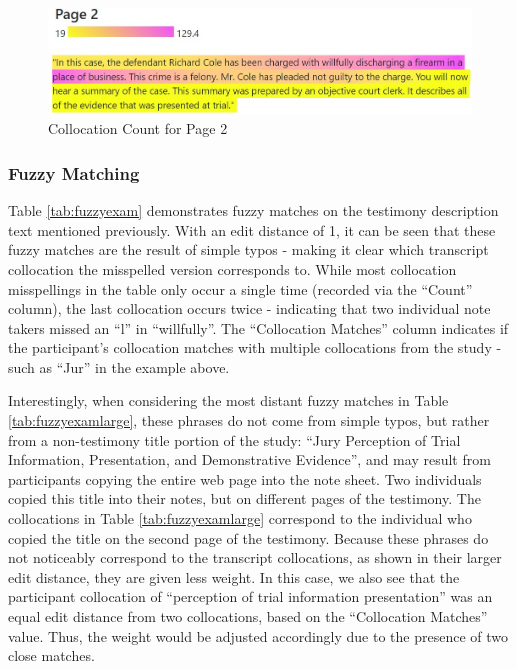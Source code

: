 \documentclass[print]{nuthesis}
\begin{document}
\begin{figure}

{\centering \includegraphics[width=\linewidth]{images/collocationanalysis} 

}

\caption{Collocation Count for Page 2}\label{fig:highlights}
\end{figure}

\hypertarget{fuzzy-matching-1}{%
\subsubsection{Fuzzy Matching}\label{fuzzy-matching-1}}

Table \ref{tab:fuzzyexam} demonstrates fuzzy matches on the testimony description text mentioned previously.
With an edit distance of 1, it can be seen that these fuzzy matches are the result of simple typos - making it clear which transcript collocation the misspelled version corresponds to.
While most collocation misspellings in the table only occur a single time (recorded via the ``Count'' column), the last collocation occurs twice - indicating that two individual note takers missed an ``l'' in ``willfully''.
The ``Collocation Matches'' column indicates if the participant's collocation matches with multiple collocations from the study - such as ``Jur'' in the example above.

Interestingly, when considering the most distant fuzzy matches in Table \ref{tab:fuzzyexamlarge}, these phrases do not come from simple typos, but rather from a non-testimony title portion of the study: ``Jury Perception of Trial Information, Presentation, and Demonstrative Evidence'', and may result from participants copying the entire web page into the note sheet.
Two individuals copied this title into their notes, but on different pages of the testimony.
The collocations in Table \ref{tab:fuzzyexamlarge} correspond to the individual who copied the title on the second page of the testimony.
Because these phrases do not noticeably correspond to the transcript collocations, as shown in their larger edit distance, they are given less weight.
In this case, we also see that the participant collocation of ``perception of trial information presentation'' was an equal edit distance from two collocations, based on the ``Collocation Matches'' value.
Thus, the weight would be adjusted accordingly due to the presence of two close matches.
\end{document}

